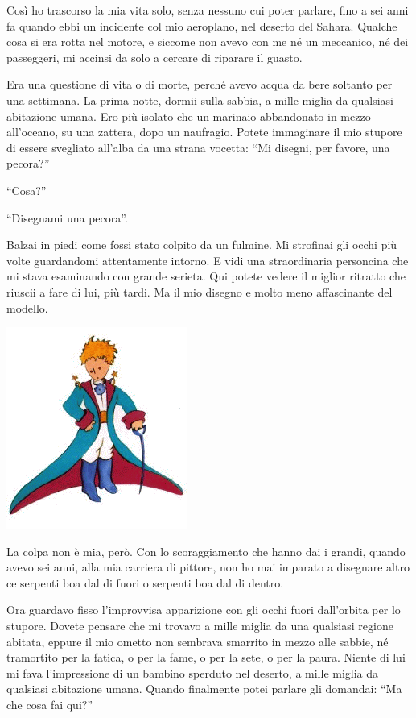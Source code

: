 \documentclass[11pt]{scrbook}
\begin{document}
Così ho trascorso la mia vita solo, senza nessuno cui poter parlare,
fino a sei anni fa quando ebbi un incidente col mio aeroplano, nel
deserto del Sahara. Qualche cosa si era rotta nel motore, e siccome non
avevo con me né un meccanico, né dei passeggeri, mi accinsi da solo a
cercare di riparare il guasto.

Era una questione di vita o di morte, perché avevo acqua da bere
soltanto per una settimana. La prima notte, dormii sulla sabbia, a mille
miglia da qualsiasi abitazione umana. Ero più isolato che un marinaio
abbandonato in mezzo all'oceano, su una zattera, dopo un naufragio.
Potete immaginare il mio stupore di essere svegliato all'alba da una
strana vocetta: ``Mi disegni, per favore, una pecora?''

``Cosa?''

``Disegnami una pecora''.

Balzai in piedi come fossi stato colpito da un fulmine. Mi strofinai gli
occhi più volte guardandomi attentamente intorno. E vidi una
straordinaria personcina che mi stava esaminando con grande serieta. Qui
potete vedere il miglior ritratto che riuscii a fare di lui, più tardi.
Ma il mio disegno e molto meno affascinante del modello.

\begin{center}
\includegraphics{img/retrato}
\end{center}

La colpa non è mia, però. Con lo scoraggiamento che hanno dai i grandi,
quando avevo sei anni, alla mia carriera di pittore, non ho mai imparato
a disegnare altro ce serpenti boa dal di fuori o serpenti boa dal di
dentro.

Ora guardavo fisso l'improvvisa apparizione con gli occhi fuori
dall'orbita per lo stupore. Dovete pensare che mi trovavo a mille miglia
da una qualsiasi regione abitata, eppure il mio ometto non sembrava
smarrito in mezzo alle sabbie, né tramortito per la fatica, o per la
fame, o per la sete, o per la paura. Niente di lui mi fava l'impressione
di un bambino sperduto nel deserto, a mille miglia da qualsiasi
abitazione umana. Quando finalmente potei parlare gli domandai: ``Ma che
cosa fai qui?''
\end{document}
